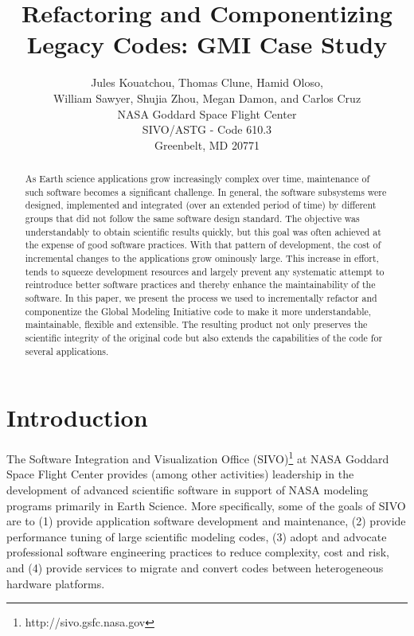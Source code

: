 \documentclass[11pt]{article}
\begin{document}
\title{\huge \bf Refactoring and Componentizing Legacy Codes: GMI Case Study}
\author{{\sc Jules Kouatchou, Thomas Clune, Hamid Oloso,} \\ 
{\sc William Sawyer, Shujia Zhou, Megan Damon, and Carlos Cruz} \\
NASA Goddard Space Flight Center \\
SIVO/ASTG - Code 610.3 \\ Greenbelt, MD 20771}
\date{}
\maketitle

\begin{abstract}
  As Earth science applications grow increasingly complex over time,
  maintenance of such software becomes a significant challenge.  In
  general, the software subsystems were designed, implemented and
  integrated (over an extended period of time) by different groups
  that did not follow the same software design standard.  The
  objective was understandably to obtain scientific results quickly,
  but this goal was often achieved at the expense of good software
  practices.  With that pattern of development, the cost of
  incremental changes to the applications grow ominously large.  This
  increase in effort, tends to squeeze development resources and
  largely prevent any systematic attempt to reintroduce better
  software practices and thereby enhance the maintainability of the
  software.  In this paper, we present the process we used to
  incrementally refactor and componentize the Global Modeling
  Initiative code to make it more understandable, maintainable,
  flexible and extensible. The resulting product not only preserves
  the scientific integrity of the original code but also extends the
  capabilities of the code for several applications.
\end{abstract}




\section{Introduction}
The Software Integration and Visualization Office
(SIVO)\footnote{http://sivo.gsfc.nasa.gov} at NASA Goddard Space
Flight Center provides (among other activities) leadership in the
development of advanced scientific software in support of NASA
modeling programs primarily in Earth Science.  More specifically, some of
the goals of SIVO are to (1) provide application software development
and maintenance, (2) provide performance tuning of large scientific
modeling codes, (3) adopt and advocate professional software
engineering practices to reduce complexity, cost and risk, and (4)
provide services to migrate and convert codes between heterogeneous
hardware platforms.
%
\end{document}
